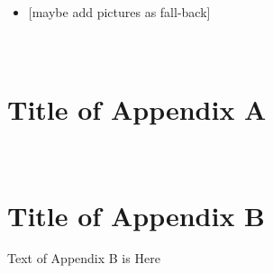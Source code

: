 \documentclass[a4paper,12pt]{article}
\begin{document}
\begin{itemize}
\tightlist
\item
  {[}maybe add pictures as fall-back{]}
\end{itemize}

\newpage
\appendix
\section{\\Title of Appendix A} \label{App:AppendixA}





\newpage
\section{\\Title of Appendix B} \label{App:AppendixB}

Text of Appendix B is Here
\end{document}

